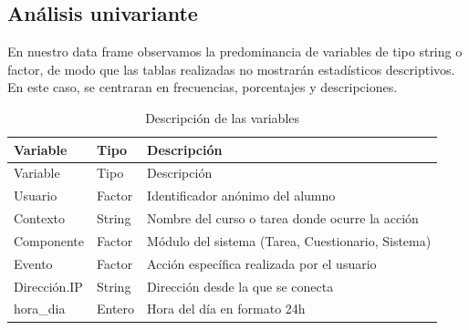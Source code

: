 \documentclass[notspecified,article,submit,moreauthors,pdftex]{Definitions/mdpi}
\begin{document}
\subsection{Análisis univariante}\label{anuxe1lisis-univariante}

En nuestro data frame observamos la predominancia de variables de tipo
string o factor, de modo que las tablas realizadas no mostrarán
estadísticos descriptivos. En este caso, se centraran en frecuencias,
porcentajes y descripciones.

\begin{longtable}[]{@{}
  >{\raggedright\arraybackslash}p{}
  >{\raggedright\arraybackslash}p{}
  >{\raggedright\arraybackslash}p{}@{}}
\caption{Descripción de las variables}\tabularnewline
\toprule\noalign{}
\begin{minipage}[b]{\linewidth}\raggedright
Variable
\end{minipage} & \begin{minipage}[b]{\linewidth}\raggedright
Tipo
\end{minipage} & \begin{minipage}[b]{\linewidth}\raggedright
Descripción
\end{minipage} \\
\midrule\noalign{}
\endfirsthead
\toprule\noalign{}
\begin{minipage}[b]{\linewidth}\raggedright
Variable
\end{minipage} & \begin{minipage}[b]{\linewidth}\raggedright
Tipo
\end{minipage} & \begin{minipage}[b]{\linewidth}\raggedright
Descripción
\end{minipage} \\
\midrule\noalign{}
\endhead
\bottomrule\noalign{}
\endlastfoot
Usuario & Factor & Identificador anónimo del alumno \\
Contexto & String & Nombre del curso o tarea donde ocurre la acción \\
Componente & Factor & Módulo del sistema (Tarea, Cuestionario,
Sistema) \\
Evento & Factor & Acción específica realizada por el usuario \\
Dirección.IP & String & Dirección desde la que se conecta \\
hora\_dia & Entero & Hora del día en formato 24h \\
\end{longtable}
\end{document}
